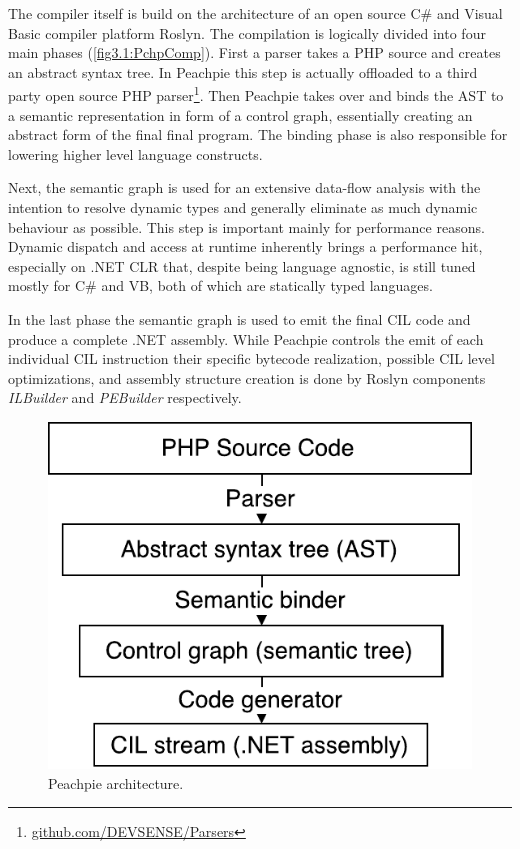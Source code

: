 The compiler itself is build on the architecture of an open source C\# and Visual Basic compiler platform Roslyn. The compilation is logically divided into four main phases (\autoref{fig3.1:PchpComp}). First a parser takes a PHP source and creates an abstract syntax tree. In Peachpie this step is actually offloaded to a third party open source PHP parser\footnote{\href{https://github.com/DEVSENSE/Parsers}{github.com/DEVSENSE/Parsers}}. Then Peachpie takes over and binds the AST to a semantic representation in form of a control graph, essentially creating an abstract form of the final final program. The binding phase is also responsible for lowering higher level language constructs.

Next, the semantic graph is used for an extensive data-flow analysis with the intention to resolve dynamic types and generally eliminate as much dynamic behaviour as possible. This step is important mainly for performance reasons. Dynamic dispatch and access at runtime inherently brings a performance hit, especially on .NET CLR that, despite being language agnostic, is still tuned mostly for C\# and VB, both of which are statically typed languages.

In the last phase the semantic graph is used to emit the final CIL code and produce a complete .NET assembly. While Peachpie controls the emit of each individual CIL instruction their specific bytecode realization, possible CIL level optimizations, and assembly structure creation is done by Roslyn components \emph{ILBuilder} and \emph{PEBuilder} respectively.

\begin{figure}[h]
	\centering	
	\includegraphics[scale=0.75]{../img/3_1_Peachpie}	
	\caption{Peachpie architecture.}
	\label{fig3.1:PchpComp}
\end{figure}

